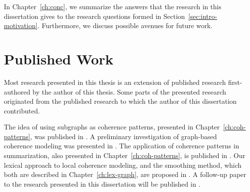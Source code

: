In Chapter~\ref{ch:conc}, we summarize the answers that the research in this dissertation gives to the research questions formed in Section~\ref{sec:intro-motivation}. 
Furthermore, we discuss possible avenues for future work. 

\section{Published Work}
\label{sec:intro-published}

Most research presented in this thesis is an extension of published research first-authored by the author of this thesis. 
Some parts of the presented research originated from the published research to which the author of this dissertation contributed. 

The idea of using subgraphs as coherence patterns, presented in Chapter~\ref{ch:coh-patterns}, was published in . 
A preliminary investigation of graph-based coherence modeling was presented in . 
The application of coherence patterns in summarization, also presented in Chapter~\ref{ch:coh-patterns}, is published in . 
Our lexical approach to local coherence modeling, and the smoothing method, which both are described in Chapter~\ref{ch:lex-graph}, are proposed in .
A follow-up paper to the research presented in this dissertation will be published in . 


